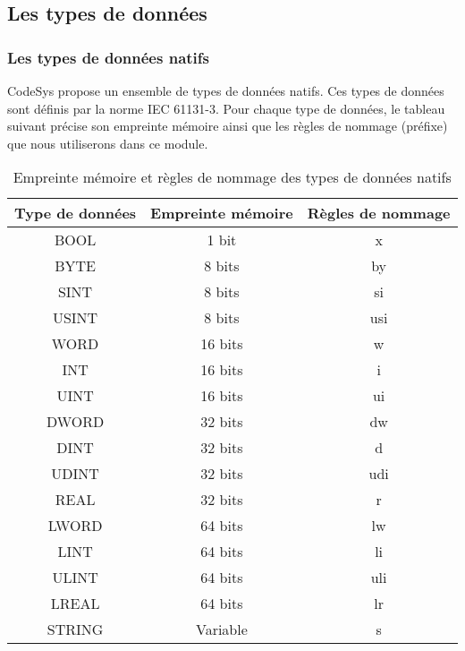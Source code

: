 \subsection{Les types de données}
\subsubsection{Les types de données natifs}
CodeSys propose un ensemble de types de données natifs. Ces types de données sont définis par la norme IEC 61131-3. 
Pour chaque type de données, le tableau suivant précise son empreinte mémoire ainsi que les règles de nommage (préfixe) que nous utiliserons dans ce module. 


\begin{table}[htbp]
    \centering
    \begin{tabular}{|c|c|c|}
        \hline
        \rowcolor{gray!30} \textbf{Type de données} & \textbf{Empreinte mémoire} & \textbf{Règles de nommage} \\
        \hline
        BOOL & 1 bit & x \\
        \hline
        BYTE & 8 bits & by \\
        \hline
        SINT & 8 bits & si \\
        \hline
        USINT & 8 bits & usi \\
        \hline
        WORD & 16 bits & w \\
        \hline
        INT & 16 bits & i \\
        \hline
        UINT & 16 bits & ui \\
        \hline
        DWORD & 32 bits & dw \\
        \hline
        DINT & 32 bits & d \\
        \hline
        UDINT & 32 bits & udi \\
        \hline
        REAL & 32 bits & r \\
        \hline
        LWORD & 64 bits & lw \\
        \hline
        LINT & 64 bits & li \\
        \hline
        ULINT & 64 bits & uli \\
        \hline
        LREAL & 64 bits & lr \\
        \hline
        STRING & Variable & s \\
        \hline
    \end{tabular}
    \caption{Empreinte mémoire et règles de nommage des types de données natifs}
    \label{tab:types_donnees}
\end{table}

